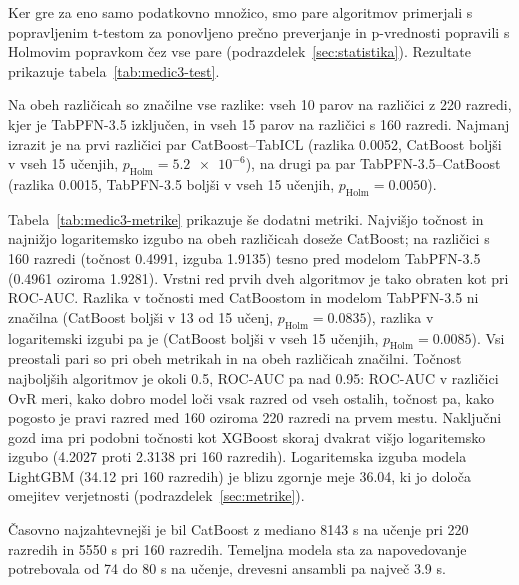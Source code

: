 \documentclass[a4paper,12pt,openright]{book}
\begin{document}
Ker gre za eno samo podatkovno množico, smo pare algoritmov primerjali s
popravljenim t-testom za ponovljeno prečno preverjanje in p-vrednosti popravili
s Holmovim popravkom čez vse pare (podrazdelek~\ref{sec:statistika}).
Rezultate prikazuje tabela~\ref{tab:medic3-test}.



Na obeh različicah so značilne vse razlike: vseh 10 parov na različici z 220
razredi, kjer je TabPFN-3.5 izključen, in vseh 15 parov na različici s 160
razredi. Najmanj izrazit je na prvi različici par CatBoost--TabICL (razlika
\num{0.0052}, CatBoost boljši v vseh 15 učenjih, $p_\mathrm{Holm} =
\num{5.2e-6}$), na drugi pa par TabPFN-3.5--CatBoost (razlika \num{0.0015},
TabPFN-3.5 boljši v vseh 15 učenjih, $p_\mathrm{Holm} = \num{0.0050}$).

Tabela~\ref{tab:medic3-metrike} prikazuje še dodatni metriki. Najvišjo
točnost in najnižjo logaritemsko izgubo na obeh različicah doseže CatBoost; na
različici s 160 razredi (točnost \num{0.4991}, izguba \num{1.9135}) tesno pred
modelom TabPFN-3.5 (\num{0.4961} oziroma \num{1.9281}). Vrstni red prvih dveh
algoritmov je tako obraten kot pri ROC-AUC. Razlika v točnosti med CatBoostom
in modelom TabPFN-3.5 ni značilna (CatBoost boljši v 13 od 15 učenj,
$p_\mathrm{Holm} = \num{0.0835}$), razlika v logaritemski izgubi pa je (CatBoost
boljši v vseh 15 učenjih, $p_\mathrm{Holm} = \num{0.0085}$). Vsi preostali pari so
pri obeh metrikah in na obeh različicah značilni. Točnost najboljših algoritmov
je okoli \num{0.5}, ROC-AUC pa nad \num{0.95}: ROC-AUC v različici OvR meri, kako
dobro model loči vsak razred od vseh ostalih, točnost pa, kako pogosto je pravi
razred med 160 oziroma 220 razredi na prvem mestu. Naključni gozd ima pri
podobni točnosti kot XGBoost skoraj dvakrat višjo logaritemsko izgubo
(\num{4.2027} proti \num{2.3138} pri 160 razredih). Logaritemska izguba modela
LightGBM (\num{34.12} pri 160 razredih) je blizu zgornje meje \num{36.04}, ki jo
določa omejitev verjetnosti (podrazdelek~\ref{sec:metrike}).



Časovno najzahtevnejši je bil CatBoost z mediano \num{8143} s na učenje pri 220
razredih in \num{5550} s pri 160 razredih. Temeljna modela sta za napovedovanje
potrebovala od \num{74} do \num{80} s na učenje, drevesni ansambli pa največ
\num{3.9} s.
\end{document}
